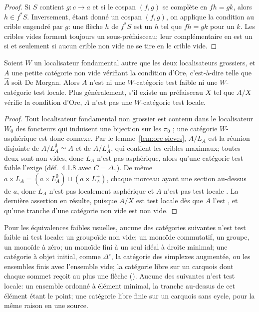\begin{proof}
Si $S$ contient $g\colon c\to a$ et si le cospan $(f,g)$ se complète en $fh = gk$, alors $h\in f^*S$. Inversement, étant donné un cospan $(f,g)$, on applique la condition au crible engendré par $g$: une flèche $h$ de $f^*S$ est un $h$ tel que $fh = gk$ pour un $k$. Les cribles vides forment toujours un sous-préfaisceau; leur complémentaire en est un si et seulement si aucun crible non vide ne se tire en le crible vide.
\end{proof}

\begin{theorem}\label{th:ore}
Soient $W$ un localisateur fondamental autre que les deux localisateurs grossiers, et $A$ une petite catégorie non vide vérifiant la condition d'Ore, c'est-à-dire telle que $\widehat A$ soit De Morgan. Alors $A$ n'est ni une $W$-catégorie test faible ni une $W$-catégorie test locale. Plus généralement, s'il existe un préfaisceau $X$ tel que $A/X$ vérifie la condition d'Ore, $A$ n'est pas une $W$-catégorie test locale.
\end{theorem}

\begin{proof}
Tout localisateur fondamental non grossier est contenu dans le localisateur $W_0$ des foncteurs qui induisent une bijection sur les $\pi_0$ \cite[prop.~9.3.2]{cisinski-308}; une catégorie $W$-asphérique est donc connexe. Par le lemme~\ref{lem:ore-sieves}, $A/L_A$ est la réunion disjointe de $A/L_A^{\emptyset}\simeq A$ et de $A/L_A^{+}$, qui contient les cribles maximaux; toutes deux sont non vides, donc $L_A$ n'est pas asphérique, alors qu'une catégorie test faible l'exige (déf.~4.1.8 avec $C=\Delta_1$). De même $a\times L_A = (a\times L_A^{\emptyset})\sqcup(a\times L_A^{+})$, chaque morceau ayant une section au-dessus de $a$, donc $L_A$ n'est pas localement asphérique et $A$ n'est pas test locale \cite[th.~4.1.19]{cisinski-308}. La dernière assertion en résulte, puisque $A/X$ est test locale dès que $A$ l'est \cite[prop.~4.1.14 (v)]{cisinski-308}, et qu'une tranche d'une catégorie non vide est non vide.
\end{proof}

\begin{corollary}\label{cor:ore}
Pour les équivalences faibles usuelles, aucune des catégories suivantes n'est test faible ni test locale: un groupoïde non vide; un monoïde commutatif, un groupe, un monoïde à zéro; un monoïde fini à un seul idéal à droite minimal; une catégorie à objet initial, comme $\Delta^{\circ}$, la catégorie des simplexes augmentée, ou les ensembles finis avec l'ensemble vide; la catégorie libre sur un carquois dont chaque sommet reçoit au plus une flèche (). Aucune des suivantes n'est test locale: un ensemble ordonné à élément minimal, la tranche au-dessus de cet élément étant le point; une catégorie libre finie sur un carquois sans cycle, pour la même raison en une source.
\end{corollary}

